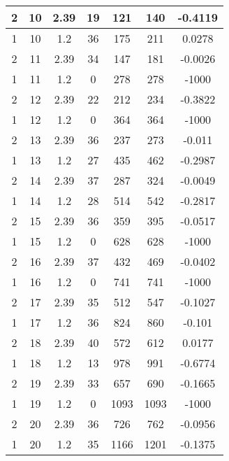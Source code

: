 \documentclass[letterpaper, 12pt]{article}
\begin{document}
\begin{longtable}{|c|c|c|c|c|c|c|}
\hline
2 & 10 & 2.39 & 19 & 121 & 140 & -0.4119 \\
\hline
1 & 10 & 1.2 & 36 & 175 & 211 & 0.0278 \\
\hline
2 & 11 & 2.39 & 34 & 147 & 181 & -0.0026 \\
\hline
1 & 11 & 1.2 & 0 & 278 & 278 & -1000 \\
\hline
2 & 12 & 2.39 & 22 & 212 & 234 & -0.3822 \\
\hline
1 & 12 & 1.2 & 0 & 364 & 364 & -1000 \\
\hline
2 & 13 & 2.39 & 36 & 237 & 273 & -0.011 \\
\hline
1 & 13 & 1.2 & 27 & 435 & 462 & -0.2987 \\
\hline
2 & 14 & 2.39 & 37 & 287 & 324 & -0.0049 \\
\hline
1 & 14 & 1.2 & 28 & 514 & 542 & -0.2817 \\
\hline
2 & 15 & 2.39 & 36 & 359 & 395 & -0.0517 \\
\hline
1 & 15 & 1.2 & 0 & 628 & 628 & -1000 \\
\hline
2 & 16 & 2.39 & 37 & 432 & 469 & -0.0402 \\
\hline
1 & 16 & 1.2 & 0 & 741 & 741 & -1000 \\
\hline
2 & 17 & 2.39 & 35 & 512 & 547 & -0.1027 \\
\hline
1 & 17 & 1.2 & 36 & 824 & 860 & -0.101 \\
\hline
2 & 18 & 2.39 & 40 & 572 & 612 & 0.0177 \\
\hline
1 & 18 & 1.2 & 13 & 978 & 991 & -0.6774 \\
\hline
2 & 19 & 2.39 & 33 & 657 & 690 & -0.1665 \\
\hline
1 & 19 & 1.2 & 0 & 1093 & 1093 & -1000 \\
\hline
2 & 20 & 2.39 & 36 & 726 & 762 & -0.0956 \\
\hline
1 & 20 & 1.2 & 35 & 1166 & 1201 & -0.1375 \\
\hline
\end{longtable}
\end{document}

